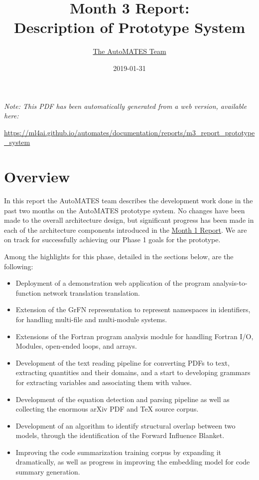 \documentclass[article, 12pt, oneside]{memoir}
\title{Month 3 Report:\\Description of Prototype System}
\author{\href{https://ml4ai.github.io/automates/team/}{The AutoMATES Team}}
\date{2019-01-31}
\begin{document}
\maketitle
\tableofcontents*

\bigskip
\bigskip

\noindent \emph{Note: This PDF has been automatically generated from a web
  version, available here:}

  {
  \small
\noindent \url{https://ml4ai.github.io/automates/documentation/reports/m3_report_prototype_system}
}

\hypertarget{overview}{%
\section{Overview}\label{overview}}

In this report the AutoMATES team describes the development work done in
the past two months on the AutoMATES prototype system. No changes have
been made to the overall architecture design, but significant progress
has been made in each of the architecture components introduced in the
\href{https://ml4ai.github.io/automates/documentation/reports/m1_architecture_report/}{Month
1 Report}. We are on track for successfully achieving our Phase 1 goals
for the prototype.

Among the highlights for this phase, detailed in the sections below, are
the following:

\begin{itemize}
\tightlist
\item
  Deployment of a demonstration web application of the program
  analysis-to-function network translation translation.
\item
  Extension of the GrFN representation to represent namespaces in
  identifiers, for handling multi-file and multi-module systems.
\item
  Extensions of the Fortran program analysis module for handling Fortran
  I/O, Modules, open-ended loops, and arrays.
\item
  Development of the text reading pipeline for converting PDFs to text,
  extracting quantities and their domains, and a start to developing
  grammars for extracting variables and associating them with values.
\item
  Development of the equation detection and parsing pipeline as well as
  collecting the enormous arXiv PDF and TeX source corpus.
\item
  Development of an algorithm to identify structural overlap between two
  models, through the identification of the Forward Influence Blanket.
\item
  Improving the code summarization training corpus by expanding it
  dramatically, as well as progress in improving the embedding model for
  code summary generation.
\end{itemize}
\end{document}
